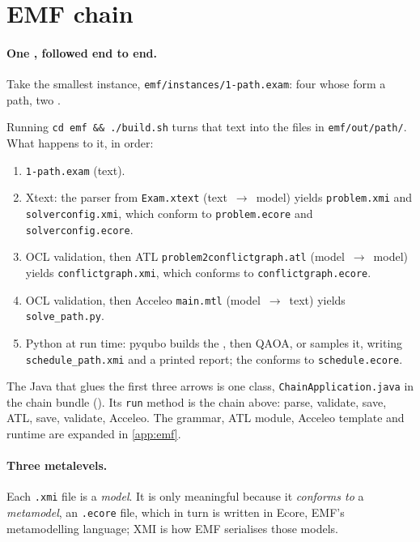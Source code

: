 \section{EMF chain}\label{sec:emf}

\paragraph{One , followed end to end.}
Take the smallest instance, \texttt{emf/instances/1-path.exam}: four  whose  form a path,
two .


Running \texttt{cd emf \&\& ./build.sh} turns that text into the files in \texttt{emf/out/path/}. What
happens to it, in order:

\begin{enumerate}[nosep, leftmargin=*]
	\item \texttt{1-path.exam} (text).
	\item Xtext: the parser from \texttt{Exam.xtext} (text~$\to$~model) yields \texttt{problem.xmi} and
	      \texttt{solverconfig.xmi}, which conform to \texttt{problem.ecore} and \texttt{solverconfig.ecore}.
	\item OCL validation, then ATL \texttt{problem2conflictgraph.atl} (model~$\to$~model) yields
	      \texttt{conflictgraph.xmi}, which conforms to \texttt{conflictgraph.ecore}.
	\item OCL validation, then Acceleo \texttt{main.mtl} (model~$\to$~text) yields
	      \texttt{solve\_path.py}.
	\item Python at run time: pyqubo builds the , then QAOA,  or
	       samples it, writing \texttt{schedule\_path.xmi} and a printed report; the
	       conforms to \texttt{schedule.ecore}.
\end{enumerate}

The Java that glues the first three arrows is one class,
\texttt{ChainApplication.java} in the chain bundle
(). Its \texttt{run} method is the chain above: parse,
validate, save, ATL, save, validate, Acceleo. The grammar, ATL module, Acceleo template and runtime are
expanded in \cref{app:emf}.

\paragraph{Three metalevels.}
Each \texttt{.xmi} file is a \emph{model}. It is only meaningful because it \emph{conforms to} a
\emph{metamodel}, an \texttt{.ecore} file, which in turn is written in Ecore, EMF's metamodelling language;
XMI is how EMF serialises those models.

